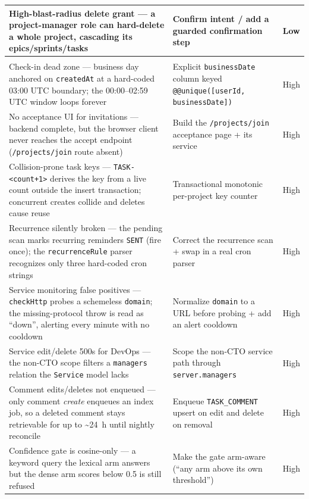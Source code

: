 \begin{longtable}{@{}>{\raggedright\arraybackslash}p{6.3cm}>{\raggedright\arraybackslash}p{6.5cm}>{\raggedright\arraybackslash}p{1.4cm}@{}}
\midrule
High-blast-radius delete grant --- a project-manager role can hard-delete a whole project, cascading its epics/sprints/tasks & Confirm intent / add a guarded confirmation step & Low \\
\midrule
\multicolumn{3}{@{}l}{\textbf{Correctness}} \\*
\addlinespace[2pt]
Check-in dead zone --- business day anchored on \texttt{createdAt} at a hard-coded 03:00 UTC boundary; the 00:00--02:59 UTC window loops forever & Explicit \texttt{businessDate} column keyed \texttt{@@unique([userId, businessDate])} & High \\
\midrule
No acceptance UI for invitations --- backend complete, but the browser client never reaches the accept endpoint (\texttt{/projects/join} route absent) & Build the \texttt{/projects/join} acceptance page + its service & High \\
\midrule
Collision-prone task keys --- \texttt{TASK-<count+1>} derives the key from a live count outside the insert transaction; concurrent creates collide and deletes cause reuse & Transactional monotonic per-project key counter & High \\
\midrule
Recurrence silently broken --- the pending scan marks recurring reminders \texttt{SENT} (fire once); the \texttt{recurrenceRule} parser recognizes only three hard-coded cron strings & Correct the recurrence scan + swap in a real cron parser & High \\
\midrule
Service monitoring false positives --- \texttt{checkHttp} probes a schemeless \texttt{domain}; the missing-protocol throw is read as ``down'', alerting every minute with no cooldown & Normalize \texttt{domain} to a URL before probing + add an alert cooldown & High \\
\midrule
Service edit/delete 500s for DevOps --- the non-CTO scope filters a \texttt{managers} relation the \texttt{Service} model lacks & Scope the non-CTO service path through \texttt{server.managers} & High \\
\midrule
Comment edits/deletes not enqueued --- only comment \emph{create} enqueues an index job, so a deleted comment stays retrievable for up to \textasciitilde24~h until nightly reconcile & Enqueue \texttt{TASK\_COMMENT} upsert on edit and delete on removal & High \\
\midrule
Confidence gate is cosine-only --- a keyword query the lexical arm answers but the dense arm scores below 0.5 is still refused & Make the gate arm-aware (``any arm above its own threshold'') & High \\

\end{longtable}
